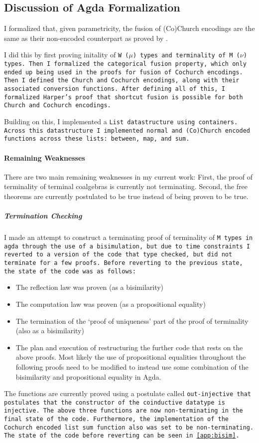 
\subsection{Discussion of Agda Formalization}\label{sec:agda_form_disc}
I formalized that, given parametricity, the fusion of (Co)Church encodings are the same as their non-encoded counterpart as proved by \cite{Harper2011}.

I did this by first proving initality of \tt{W} ($\mu$) types and terminality of \tt{M} ($\nu$) types.
Then I formalized the categorical fusion property, which only ended up being used in the proofs for fusion of Cochurch encodings.
Then I defined the Church and Cochurch encodings, along with their associated conversion functions.
After defining all of this, I formalized Harper's proof that shortcut fusion is possible for both Church and Cochurch encodings.

Building on this, I implemented a \tt{List} datastructure using containers.
Across this datastructure I implemented normal and (Co)Church encoded functions across these lists: \tt{between}, \tt{map}, and \tt{sum}.

\paragraph{Remaining Weaknesses}
There are two main remaining weaknesses in my current work:
First, the proof of terminality of terminal coalgebras is currently not terminating.
Second, the free theorems are currently postulated to be true instead of being proven to be true.

\subparagraph{Termination Checking}
I made an attempt to construct a terminating proof of terminality of \tt{M} types in agda through the use of a bisimulation, but due to time constraints I reverted to a version of the code that type checked, but did not terminate for a few proofs.
Before reverting to the previous state, the state of the code was as follows:
\begin{itemize}[noitemsep]
  \item The reflection law was proven (as a bisimilarity)
  \item The computation law was proven (as a propositional equality)
  \item The termination of the `proof of uniqueness' part of the proof of terminality (also as a bisimilarity)
  \item The plan and execution of restructuring the further code that rests on the above proofs.
  Most likely the use of propositional equalities throughout the following proofs need to be modified to instead use some combination of the bisimilarity and propositional equality in Agda.
\end{itemize}
The functions are currently proved using a postulate called \tt{out-injective} that postulates that the constructor of the coinductive datatype is injective.
The above three functions are now non-terminating in the final state of the code.
Furthermore, the implementation of the Cochurch encoded list \tt{sum} function also was set to be non-terminating.
The state of the code before reverting can be seen in \autoref{app:bisim}.

